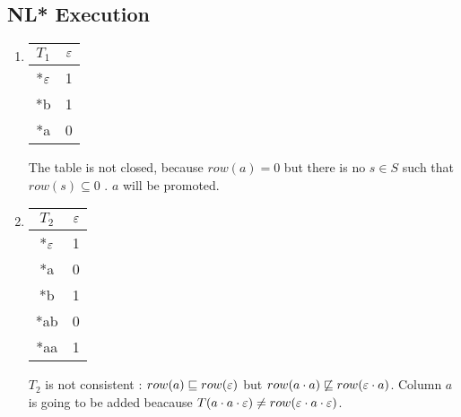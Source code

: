\subsection{NL* Execution}
\begin{enumerate}
  \item \begin{minipage}{0.3\textwidth}
          \begin{tabular}{c||c}
            $T_1$              & $\varepsilon$ \\
            \hline\hline
            *$\varepsilon$\footnotemark & 1    \\
            \hline\hline
            *b                 & 1    \\
            *a                 & 0    \\
          \end{tabular}
        \end{minipage}  \quad
        \begin{minipage}{0.6\textwidth}
          The table is not closed, because $row(a) = 0$ but there is no $s \in S$ such that $row(s) \subseteq 0$ . $a$ will be promoted.
        \end{minipage}

  \item \begin{minipage}{0.3\textwidth}
          \begin{tabular}{c||c}
            $T_2$ & $\varepsilon$ \\
            \hline\hline
            *$\varepsilon$ & 1    \\
            *a    & 0    \\
            \hline\hline
            *b    & 1    \\
            *ab   & 0    \\
            *aa   & 1    \\
          \end{tabular}
        \end{minipage}\quad
        \begin{minipage}{0.6\textwidth}
          $T_2$ is not consistent : $row(a) \sqsubseteq row(\varepsilon)$ but $row(a \cdot a) \not\sqsubseteq row(\varepsilon \cdot a)$. Column $a$ is going to be added beacause $T(a \cdot a \cdot \varepsilon) \neq row(\varepsilon \cdot a \cdot \varepsilon)$.
        \end{minipage}


\end{enumerate}
